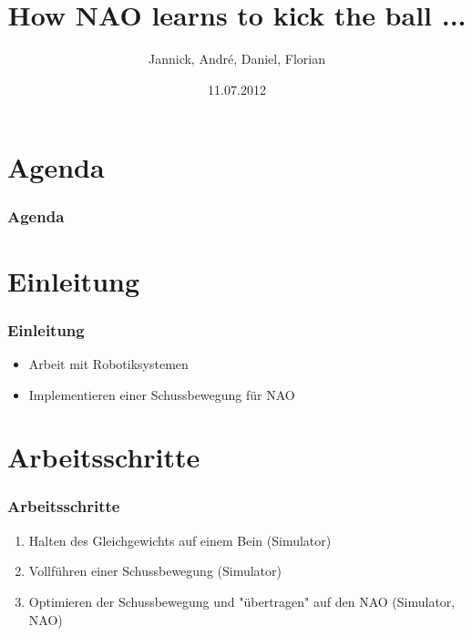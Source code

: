 \documentclass[]{beamer}
\title{How NAO learns to kick the ball ...}
\author{Jannick, André, Daniel, Florian}
\date{11.07.2012}
\begin{document}
\begin{frame}
	\titlepage
\end{frame}

\section*{Agenda}
\begin{frame}
	\frametitle{Agenda}
  	\tableofcontents
\end{frame}

\section{Einleitung}
\begin{frame}
	\frametitle{Einleitung}
	\begin{itemize}
		\item Arbeit mit Robotiksystemen
		\item Implementieren einer Schussbewegung für NAO
	\end{itemize}		
\end{frame}

\section{Arbeitsschritte}
\begin{frame}
	\frametitle{Arbeitsschritte}
	\begin{enumerate}
		\item Halten des Gleichgewichts auf einem Bein (Simulator)
		\item Vollführen einer Schussbewegung (Simulator)
		\item Optimieren der Schussbewegung und "übertragen" auf den NAO (Simulator, NAO)
	\end{enumerate}
\end{frame}
\end{document}
